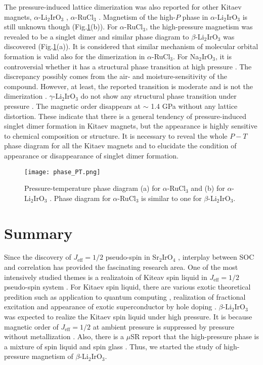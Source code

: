 \documentclass[a4,10.5pt]{report}
\begin{document}
The pressure-induced lattice dimerization was also reported for other Kitaev magnets, $\alpha$-Li$_2$IrO$_3$ \cite{Hermann2018}, $\alpha$-RuCl$_3$ \cite{Bastien2018}. 
Magnetism of the high-$P$ phase in $\alpha$-Li$_2$IrO$_3$ is still unknown though (Fig.\ref{phase_PT}(b)).
For $\alpha$-RuCl$_3$, the high-pressure magnetism was revealed to be a singlet dimer and similar phase diagram to $\beta$-Li$_2$IrO$_3$ was discovered (Fig.\ref{phase_PT}(a)).
It is considered that similar mechanism of molecular orbital formation is valid also for the dimerization in $\alpha$-RuCl$_3$.
For Na$_2$IrO$_3$, it is controversial whether it has a structural phase transition at high pressure \cite{Hermann2017, Xi2018}.
The discrepancy possibly comes from the air- and moisture-sensitivity of the compound.
However, at least, the reported transition is moderate and is not the dimerization \cite{Xi2018}. 
$\gamma$-Li$_2$IrO$_3$ do not show any structural phase transition under pressure \cite{breznay2017resonant}. 
The magnetic order disappears at $\sim$ 1.4 GPa without any lattice distortion. 
These indicate that there is a general tendency of pressure-induced singlet dimer formation in Kitaev magnets, 
but the appearance is highly sensitive to chemical composition or structure. 
It is necessary to reveal the whole $P-T$ phase diagram for all the Kitaev magnets and to elucidate the condition of appearance or disappearance of singlet dimer formation.

\begin{figure}
  \centering
  \texttt{[image: phase\_PT.png]}
  \caption{Pressure-temperature phase diagram (a) for $\alpha$-RuCl$_3$ \cite{Bastien2018} and (b) for $\alpha$-Li$_2$IrO$_3$ \cite{Hermann2018}.
  Phase diagram for $\alpha$-RuCl$_3$ is similar to one for $\beta$-Li$_2$IrO$_3$.} 
  \label{phase_PT}
\end{figure}

\chapter{Summary}
Since the discovery of $J_\mathrm{eff} = 1/2$ pseudo-spin in Sr$_2$IrO$_4$ \cite{kim2008novel, kim2009phase}, 
interplay between SOC and correlation has provided the fascinating research area.
One of the most intensively studied themes is a realizatoin of Kiteav spin liquid in $J_\mathrm{eff} = 1/2$ pseudo-spin system \cite{kitaev2006anyons, jackeli2009mott}.
For Kitaev spin liquid, there are various exotic theoretical predition such as application to quantum computing \cite{kitaev2006anyons}, 
realization of fractional excitation \cite{nasu2015thermal, yoshitake2017temperature}
and appearance of exotic superconductor by hole doping \cite{you2012doping}.
$\beta$-Li$_2$IrO$_3$ was expected to realize the Kitaev spin liquid under high pressure.
It is because magnetic order of $J_\mathrm{eff} = 1/2$ at ambient pressure is suppressed by pressure without metallization \cite{takayama2015hyperhoneycomb}.
Also, there is a $\mu$SR report that the high-pressure phase is a mixture of spin liquid and spin glass  \cite{Majumder2018}.
Thus, we started the study of high-pressure magnetism of $\beta$-Li$_2$IrO$_3$.
\end{document}

